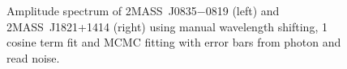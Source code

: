 \documentclass[manuscript]{aastex6}
\newcommand{\sha}{2MASS~J0835$-$0819}
\newcommand{\shb}{2MASS~J1821+1414}
\begin{document}
\begin{figure}[!t]
\centering
{}
	\caption{Amplitude spectrum of {\sha} (left)  and {\shb} (right) using manual wavelength shifting, 1 cosine term fit and MCMC fitting with error bars from photon and read noise.}
	\label{fig:ampSpecManualS}
	\vspace{0.1in}
\end{figure} 
\end{document}
